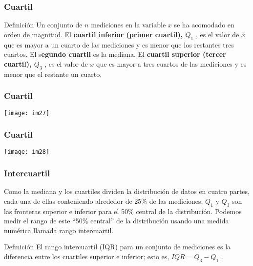 \documentclass[spanish]{beamer}
\begin{document}
\begin{frame}
\frametitle{Cuartil}

\begin{block}{Definición}
Un conjunto de $n$ mediciones en la variable $x$ se ha acomodado en orden
de magnitud. El \textbf{cuartil inferior (primer cuartil), $Q_{1}$ }, es el valor de $x$ que es mayor a un cuarto de las mediciones y es menor que los restantes tres cuartos. El s\textbf{egundo cuartil} es la mediana. El \textbf{cuartil superior (tercer cuartil), $Q_{3}$ }, es el valor de $x$ que es mayor a tres cuartos de las mediciones y es menor que el restante un cuarto.
\end{block}

\end{frame}
\begin{frame}
\frametitle{Cuartil}

\begin{center}
\texttt{[image: im27]}
\end{center}


\end{frame}
\begin{frame}
\frametitle{Cuartil}

\begin{center}
\texttt{[image: im28]}
\end{center}


\end{frame}
\begin{frame}
\frametitle{Intercuartil}
Como la mediana y los cuartiles dividen la distribución de datos en cuatro partes, cada una de ellas conteniendo alrededor de 25\% de las mediciones, $Q_1$ y $Q_3$ son las fronteras superior e inferior para el 50\% central de la distribución. Podemos medir el rango de este “50\% central” de la distribución usando una medida numérica llamada rango intercuartil.

\begin{block}{Definición}
El rango intercuartil (IQR) para un conjunto de mediciones es la diferencia entre los cuartiles superior e inferior; esto es, $IQR = Q_3 - Q_1$ .
\end{block}
\end{frame}
\end{document}
